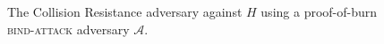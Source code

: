 \begin{figure}[t]
\begin{algorithm}[H]
    \caption{\label{alg.collision-resistance-adversary} The Collision Resistance adversary against $H$ using a proof-of-burn \textsc{bind-attack} adversary $\mathcal{A}$.}
    \begin{algorithmic}[1]
            \State{}
        \EndFunction
    \end{algorithmic}
\end{algorithm}
\end{figure}
